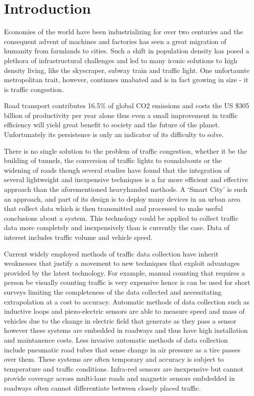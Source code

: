 \chapter{Introduction}
\parskip 0.2in
Economies of the world have been industrializing for over two centuries \cite{industrialization} and the consequent advent of machines and factories has seen a great migration of humanity from farmlands to cities. Such a shift in population density has posed a plethora of infrastructural challenges and led to many iconic solutions to high density living, like the skyscraper, subway train and traffic light. One unfortaunte metropolitan trait, however, continues unabated and is in fact growing in size \cite{trafficworse} - it is traffic congestion.

Road transport contributes 16.5\% of global CO2 emissions \cite{emissions} and costs the US \$305 billion of productivity per year alone \cite{ecotoll}\cite{cost} thus even a small improvement in traffic efficiency will yield great benefit to society and the future of the planet. Unfortunately its persistence is only an indicator of its difficulty to solve.

There is no single solution to the problem of traffic congestion, whether it be the building of tunnels, the conversion of traffic lights to roundabouts or the widening of roads though several studies \cite{mixedSolution}\cite{smartsolution}\cite{smartsolution2}\cite{smartsolution3} have found that the integration of several lightweight and inexpensive techniques is a far more efficient and effective approach than the aforementioned heavyhanded methods. A ‘Smart City’ is such an approach, and part of its design is to deploy many devices in an urban area that collect data \cite{iot} which is then transmitted and processed to make useful conclusions about a system. This technology could be applied to collect traffic data more completely and inexpensively than is currently the case. Data of interest includes traffic volume and vehicle speed.
 
Current widely employed methods of traffic data collection \cite{methodsofcollection} have inherit weaknesses that justify a movement to new techniques that exploit advantages provided by the latest technology. For example, manual counting that requires a person be visually counting traffic is very expensive hence is can be used for short surveys limiting the completeness of the data collected and necessitating extrapolation at a cost to accuracy. Automatic methods of data collection such as inductive loops and piezo-electric sensors are able to measure speed and mass of vehicles due to the change in electric field that generate as they pass a sensor however these systems are embedded in roadways and thus have high installation and maintanence costs. Less invasive automatic methods of data collection include pneumatic road tubes that sense change in air pressure as a tire passes over them. These systems are often temporary and accuracy is subject to temperature and traffic conditions. Infra-red sensors are inexpensive but cannot provide coverage across multi-lane roads and magnetic sensors embdedded in roadways often cannot differentiate between closely placed traffic. 

